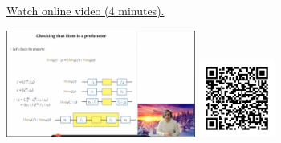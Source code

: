 
\begin{minipage}{10cm}
    \href{https://act4e-spring21.netlify.app/videos/spring2021-profunctors:hom-prof-check.html}{Watch online video (4 minutes).}
        
    \href{https://act4e-spring21.netlify.app/videos/spring2021-profunctors:hom-prof-check.html}{\includegraphics[height=3.5cm]{spring2021-profunctors:hom-prof-check/thumbnails.jpg}}
    \href{https://act4e-spring21.netlify.app/videos/spring2021-profunctors:hom-prof-check.html}{\includegraphics[height=2.5cm]{spring2021-profunctors:hom-prof-check/qrcode.png}}
\end{minipage}
